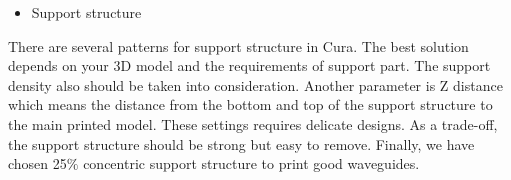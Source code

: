 \begin{itemize}
\item Support structure
\end{itemize}
There are several patterns for support structure in Cura. The best solution depends on your 3D model and the requirements of support part. The support density also should be taken into consideration. Another parameter is Z distance which means the distance from the bottom and top of the support structure to the main printed model. These settings requires delicate designs. As a trade-off, the support structure should be strong but easy to remove. Finally, we have chosen 25$\%$ concentric support structure to print good waveguides. 
\begin{figure}[htbp] %
	\centering
 

\end{figure}
